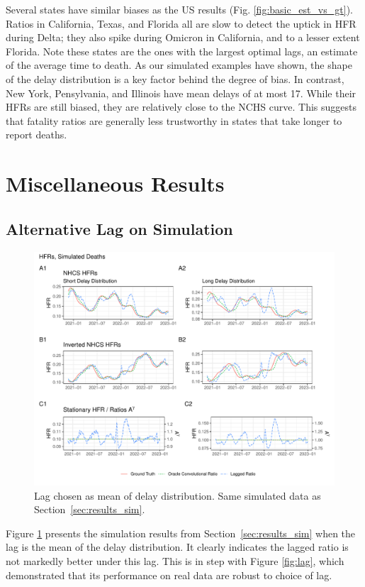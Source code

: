 \documentclass{article}
\begin{document}
Several states have similar biases as the US results (Fig. \ref{fig:basic_est_vs_gt}). Ratios in California, Texas, and Florida all are slow to detect the uptick in HFR during Delta; they also spike during Omicron in California, and to a lesser extent Florida. Note these states are the ones with the largest optimal lags, an estimate of the average time to death. As our simulated examples have shown, the shape of the delay distribution is a key factor behind the degree of bias. In contrast, New York, Pensylvania, and Illinois have mean delays of at most 17. While their HFRs are still biased, they are relatively close to the NCHS curve. This suggests that fatality ratios are generally less trustworthy in states that take longer to report deaths.

\section{Miscellaneous Results}\label{apx:misc}
\subsection{Alternative Lag on Simulation}
\begin{figure}
    \centering
    \includegraphics[width=\linewidth]{Figs/Simulated/simulated_results_corr_lag.pdf}
    \caption{Lag chosen as mean of delay distribution. Same simulated data as Section~\ref{sec:results_sim}.}
    \label{fig:sims_mean_lag}
\end{figure}

Figure \ref{fig:sims_mean_lag} presents the simulation results from Section~\ref{sec:results_sim} when the lag is the mean of the delay distribution. It clearly indicates the lagged ratio is not markedly better under this lag. This is in step with Figure \ref{fig:lag}, which demonstrated that its performance on real data are robust to choice of lag.
\end{document}
